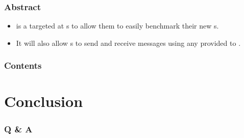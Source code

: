 \documentclass[aspectratio=169]{beamer}
\title[\tc]{\deliv{\srs}{Presentation}}
\date{\datesrs}
\begin{document}

\begin{frame}
\maketitle
\begin{center}
\names
\end{center}
\end{frame}

\begin{frame}
\frametitle{Abstract}
\begin{itemize}
\item \cry{} is a \cf{} targeted at \cg s to allow them to
easily benchmark their new \cs s.
\item It will also allow \eu s to send and receive messages
using any \cs{} provided to \cry{}.
\end{itemize}
\end{frame}

\begin{frame}
\frametitle{Contents}
\setlength{\columnsep}{0.11in}
\begin{multicols}{2}
\tableofcontents
\end{multicols}
\end{frame}








\section{Conclusion}
\begin{frame}
\frametitle{Q \& A}
\github
\end{frame}

\end{document}
